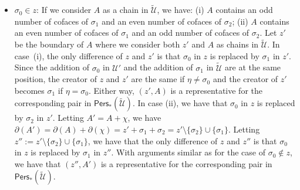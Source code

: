 \documentclass[letterpaper,11pt]{article}
\theoremstyle{mythmstyle}
\theoremstyle{mydefstyle}
\theoremstyle{plain}
\theoremstyle{definition}
\newcommand{\Pers}{\mathsf{Pers}}
\newcommand{\<}[1]{\langle #1\rangle}
\newcommand{\Set}[1]{\{#1\}}
\let\union\cup
\newcommand{\Ucal}{\mathcal{U}}
\newcommand{\sG}{\sigma}
\newcommand{\extsimp}{\chi}
\begin{document}
\begin{itemize}
    \item $\sG_0\in z$:
    If we consider $A$ as a  chain in $\tilde{\Ucal}$,
    we have: (i) $A$ contains an odd number of cofaces of $\sG_1$ 
    and an even number of cofaces of $\sG_2$;
    (ii) $A$ contains an even number of cofaces of $\sG_1$ 
    and an odd number of cofaces of $\sG_2$.
    Let $z'$ be the boundary of $A$ where we consider both $z'$ and $A$ as
    chains in $\tilde{\Ucal}$.
    In case~(i), 
    the only difference of $z$ and $z'$ is that $\sG_0$ in $z$
    is replaced by $\sG_1$ in $z'$.
    Since the addition of $\sG_0$ in $\Ucal'$
    and the addition of $\sG_1$ in $\tilde{\Ucal}$
    are at the same position,
    the creator of $z$ and $z'$ are the same if 
    $\eta\neq\sG_0$
    and the creator of $z'$ becomes ${\sG_1}$
    if $\eta=\sG_0$.
    Either way,
    $(z',A)$ is a  representative for 
    the corresponding pair in
    $\Pers_*(\tilde{\Ucal})$.
    In case (ii), 
    we have that $\sG_0$ in $z$
    is replaced by $\sG_2$ in $z'$.
    Letting $A'=A+\extsimp$,
    we have $\partial(A')=\partial(A)+\partial(\extsimp)=z'+\sG_1+\sG_2=z'\setminus\Set{\sG_2}\union\Set{\sG_1}$.
    Letting $z'':=z'\setminus\Set{\sG_2}\union\Set{\sG_1}$,
    we have that 
    the only difference of $z$ and $z''$ is that $\sG_0$ in $z$
    is replaced by $\sG_1$ in $z''$.
    With arguments similar as for the  case of $\sG_0\not\in z$,
    we have that
    $(z'',A')$ is a representative for 
    the corresponding pair in
    $\Pers_*(\tilde{\Ucal})$.
\end{itemize}
\end{document}
